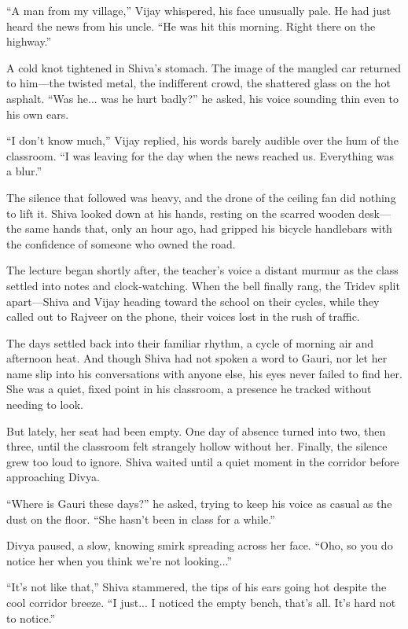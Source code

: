 ``A man from my village,'' Vijay whispered, his face unusually pale. He had just heard the news from his uncle. ``He was hit this morning. Right there on the highway.''

A cold knot tightened in Shiva's stomach. The image of the mangled car returned to him—the twisted metal, the indifferent crowd, the shattered glass on the hot asphalt. ``Was he... was he hurt badly?'' he asked, his voice sounding thin even to his own ears.

``I don't know much,'' Vijay replied, his words barely audible over the hum of the classroom. ``I was leaving for the day when the news reached us. Everything was a blur.''

The silence that followed was heavy, and the drone of the ceiling fan did nothing to lift it. Shiva looked down at his hands, resting on the scarred wooden desk—the same hands that, only an hour ago, had gripped his bicycle handlebars with the confidence of someone who owned the road.

The lecture began shortly after, the teacher's voice a distant murmur as the class settled into notes and clock-watching. When the bell finally rang, the Tridev split apart—Shiva and Vijay heading toward the school on their cycles, while they called out to Rajveer on the phone, their voices lost in the rush of traffic.

The days settled back into their familiar rhythm, a cycle of morning air and afternoon heat. And though Shiva had not spoken a word to Gauri, nor let her name slip into his conversations with anyone else, his eyes never failed to find her. She was a quiet, fixed point in his classroom, a presence he tracked without needing to look.

But lately, her seat had been empty. One day of absence turned into two, then three, until the classroom felt strangely hollow without her. Finally, the silence grew too loud to ignore. Shiva waited until a quiet moment in the corridor before approaching Divya.

``Where is Gauri these days?'' he asked, trying to keep his voice as casual as the dust on the floor. ``She hasn't been in class for a while.''

Divya paused, a slow, knowing smirk spreading across her face. ``Oho, so you do notice her when you think we're not looking...''

``It's not like that,'' Shiva stammered, the tips of his ears going hot despite the cool corridor breeze. ``I just... I noticed the empty bench, that's all. It's hard not to notice.''

